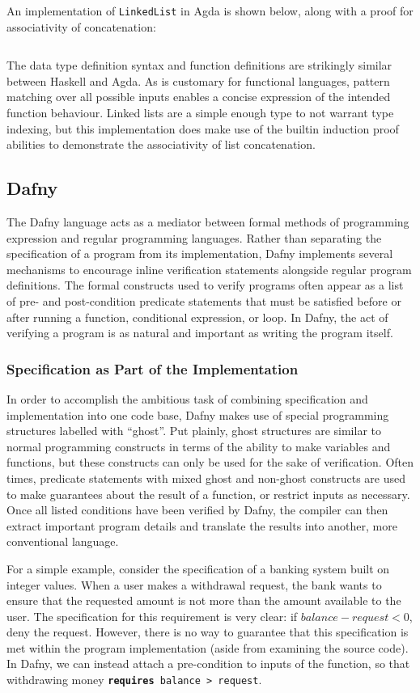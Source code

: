 \documentclass{article}
\begin{document}
An implementation of \texttt{LinkedList} in Agda is shown below, along with a proof for associativity of concatenation:
\inputminted{agda}{linked_list/main.agda}
The data type definition syntax and function definitions are strikingly similar between Haskell and Agda.
As is customary for functional languages, pattern matching over all possible inputs enables a concise expression
of the intended function behaviour. Linked lists are a simple enough type to not warrant type indexing, but this
implementation does make use of the builtin induction proof abilities to demonstrate the associativity of list concatenation.


\subsection{Dafny}

The Dafny language acts as a mediator between formal methods of programming expression and regular programming languages.
Rather than separating the specification of a program from its implementation, Dafny implements several mechanisms
to encourage inline verification statements alongside regular program definitions. The formal constructs used
to verify programs often appear as a list of pre- and post-condition
predicate statements that must be satisfied before or after running a function, conditional expression, or loop.
In Dafny, the act of verifying a program is as natural and important as writing the program itself.

\subsubsection{Specification as Part of the Implementation}

In order to accomplish the ambitious task of combining specification and implementation into one code base,
Dafny makes use of special programming structures labelled with ``ghost''. Put plainly, ghost structures are similar
to normal programming constructs in terms of the ability to make variables and functions, but these constructs
can only be used for the sake of verification. Often times, predicate statements with mixed ghost and non-ghost constructs
are used to make guarantees about the result
of a function, or restrict inputs as necessary. Once all listed conditions have been verified by Dafny,
the compiler can then extract important program details
and translate the results into another, more conventional language.

For a simple example, consider the specification of a banking system built on integer values.
When a user makes a withdrawal request, the bank wants to ensure that the requested amount is not more
than the amount available to the user. The specification for this requirement is very clear:
if $balance - request < 0$, deny the request. However, there is no way to guarantee that this specification is met
within the program implementation (aside from examining the source code). In Dafny, we can instead
attach a pre-condition to inputs of the function, so that withdrawing money \texttt{\textbf{requires} balance > request}.
\end{document}
